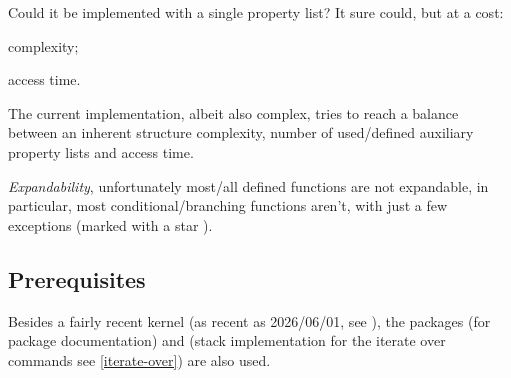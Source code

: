\documentclass[10pt]{article}
\def\Bhack[#1]{#1}
\begin{document}
\begin{tsremark}[Note:]
 Could it be implemented with a single property list? It sure could, but at a cost: 
\begin{enumerate*}   \item complexity;    \item access time.   \end{enumerate*}
The current implementation, albeit also complex, tries to reach a balance between an inherent structure complexity, number of used/defined auxiliary property lists and access time.
\end{tsremark}

\begin{tsremark}
 \textsl{Expandability}, unfortunately most/all defined functions are not expandable, in particular, most conditional/branching functions aren't, with just a few exceptions (marked with a star ).
 
\end{tsremark}

\subsection{Prerequisites}
Besides a fairly recent kernel (as recent as \Bhack[2026/06/01], see \cite{l3kernel}), the packages \cite{pkginfograb} (for package documentation) and \cite{tokglobalstack} (stack implementation for the iterate over commands see \ref{iterate-over}) are also used.
\end{document}
